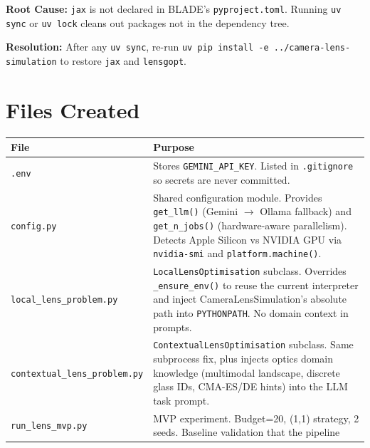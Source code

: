 \documentclass[a4paper,11pt]{article}
\begin{document}
\textbf{Root Cause:} \texttt{jax} is not declared in BLADE's
\texttt{pyproject.toml}. Running \texttt{uv sync} or \texttt{uv lock} cleans
out packages not in the dependency tree.

\textbf{Resolution:} After any \texttt{uv sync}, re-run
\texttt{uv pip install -e ../camera-lens-simulation} to restore \texttt{jax}
and \texttt{lensgopt}.

\section{Files Created}

\begin{longtable}{p{5.5cm} p{9cm}}
\toprule
\textbf{File} & \textbf{Purpose} \\
\midrule
\texttt{.env} & Stores \texttt{GEMINI\_API\_KEY}. Listed in \texttt{.gitignore}
                 so secrets are never committed. \\
\midrule
\texttt{config.py} & Shared configuration module. Provides \texttt{get\_llm()}
                      (Gemini $\to$ Ollama fallback) and \texttt{get\_n\_jobs()}
                      (hardware-aware parallelism). Detects Apple Silicon vs
                      NVIDIA GPU via \texttt{nvidia-smi} and
                      \texttt{platform.machine()}. \\
\midrule
\texttt{local\_lens\_problem.py} & \texttt{LocalLensOptimisation} subclass.
                                    Overrides \texttt{\_ensure\_env()} to reuse
                                    the current interpreter and inject
                                    CameraLensSimulation's absolute path into
                                    \texttt{PYTHONPATH}. No domain context in
                                    prompts. \\
\midrule
\texttt{contextual\_lens\_problem.py} & \texttt{ContextualLensOptimisation}
                                         subclass. Same subprocess fix, plus
                                         injects optics domain knowledge
                                         (multimodal landscape, discrete glass
                                         IDs, CMA-ES/DE hints) into the LLM
                                         task prompt. \\
\midrule
\texttt{run\_lens\_mvp.py} & MVP experiment. Budget=20, (1,1) strategy,
                              2 seeds. Baseline validation that the pipeline

\end{longtable}
\end{document}
